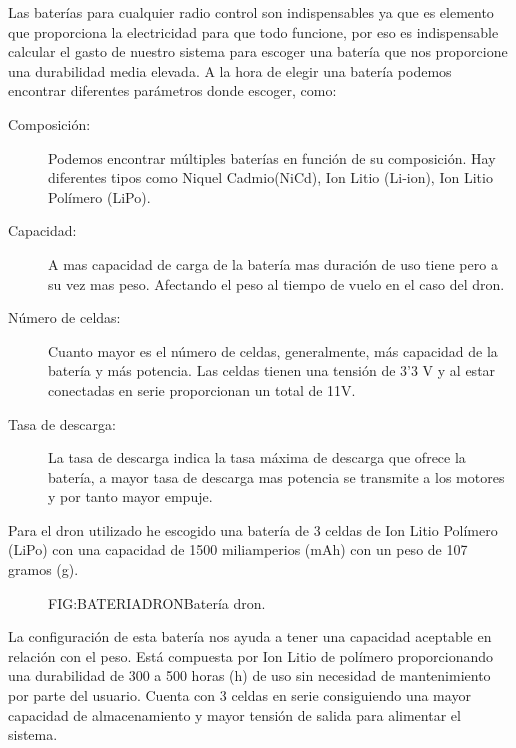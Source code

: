 
 Las baterías para cualquier radio control son indispensables ya que es elemento que proporciona la electricidad para que todo funcione, por eso es indispensable calcular el gasto de nuestro sistema para escoger una batería que nos proporcione una durabilidad media elevada.
 A la hora de elegir una batería podemos encontrar diferentes parámetros donde escoger, como:
 
 \begin{description}
 \item[Composición: ] Podemos encontrar múltiples baterías en función de su composición. Hay diferentes tipos como Niquel Cadmio(NiCd), Ion Litio (Li‑ion), Ion Litio Polímero (LiPo).
 \item[Capacidad: ] A mas capacidad de carga de la batería mas duración de uso tiene pero a su vez mas peso. Afectando el peso al tiempo de vuelo en el caso del dron.
 \item[Número de celdas: ] Cuanto mayor es el número de celdas, generalmente, más capacidad de la batería y más potencia. Las celdas tienen una tensión de 3'3 V y al estar conectadas en serie proporcionan un total de 11V.
 \item[Tasa de descarga: ] La tasa de descarga indica la tasa máxima de descarga que ofrece la batería, a mayor tasa de descarga mas potencia se transmite a los motores y por tanto mayor empuje. 
 \end{description}

Para el dron utilizado he escogido una batería de 3 celdas de Ion Litio Polímero (LiPo) con una capacidad de 1500 miliamperios (mAh) con un peso de 107 gramos (g). 

	\begin{figure}{FIG:BATERIADRON}{Batería dron.}
\end{figure}

La configuración de esta batería nos ayuda a tener una capacidad aceptable en relación con el peso. 
Está compuesta por Ion Litio de polímero proporcionando una durabilidad de 300 a 500 horas (h) de uso sin necesidad de mantenimiento por parte del usuario. 
Cuenta con 3 celdas en serie consiguiendo una mayor capacidad de almacenamiento y mayor tensión de salida para alimentar el sistema.

